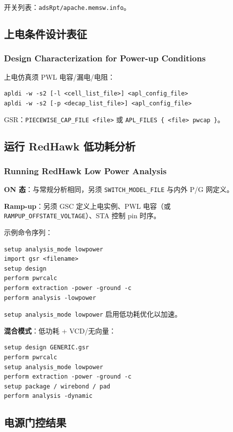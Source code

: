 开关列表：\texttt{adsRpt/apache.memsw.info}。

\subsection{上电条件设计表征}
\subsubsection*{Design Characterization for Power-up Conditions}

上电仿真须 PWL 电容/漏电/电阻：
\begin{lstlisting}
apldi -w -s2 [-l <cell_list_file>] <apl_config_file>
apldi -w -s2 [-p <decap_list_file>] <apl_config_file>
\end{lstlisting}
GSR：\texttt{PIECEWISE\_CAP\_FILE <file>} 或 \texttt{APL\_FILES \{ <file> pwcap \}}。

\subsection{运行 RedHawk 低功耗分析}
\subsubsection*{Running RedHawk Low Power Analysis}

\textbf{ON 态}：与常规分析相同，另须 \texttt{SWITCH\_MODEL\_FILE} 与内外 P/G 网定义。

\textbf{Ramp-up}：另须 GSC 定义上电实例、PWL 电容（或 \texttt{RAMPUP\_OFFSTATE\_VOLTAGE}）、STA 控制 pin 时序。

示例命令序列：
\begin{lstlisting}
setup analysis_mode lowpower
import gsr <filename>
setup design
perform pwrcalc
perform extraction -power -ground -c
perform analysis -lowpower
\end{lstlisting}

\begin{noteBox}
\texttt{setup analysis\_mode lowpower} 启用低功耗优化以加速。
\end{noteBox}

\textbf{混合模式}：低功耗 + VCD/无向量：
\begin{lstlisting}
setup design GENERIC.gsr
perform pwrcalc
setup analysis_mode lowpower
perform extraction -power -ground -c
setup package / wirebond / pad
perform analysis -dynamic
\end{lstlisting}

\subsection{电源门控结果}
